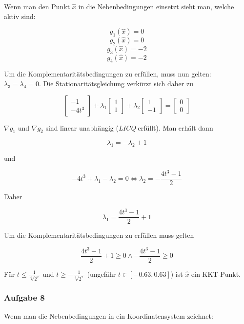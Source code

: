 \documentclass[a4paper, 12pt]{report}
\begin{document}
Wenn man den Punkt $\hat{x}$ in die Nebenbedingungen einsetzt sieht man, welche aktiv sind:

$$g_1(\hat{x}) = 0$$
$$g_2(\hat{x}) = 0$$
$$g_3(\hat{x}) = -2$$
$$g_4(\hat{x}) = -2$$

Um die Komplementaritätsbedingungen zu erfüllen, muss nun gelten:\\
$\lambda_3 = \lambda_4 = 0$. Die Stationaritätsgleichung verkürzt sich daher zu

$$\begin{bmatrix}-1\\-4t^3\end{bmatrix} + \lambda_1 \begin{bmatrix}1\\1\end{bmatrix} + \lambda_2\begin{bmatrix}1\\-1\end{bmatrix} = \begin{bmatrix}0\\0\end{bmatrix}$$

$\nabla g_1$ und $\nabla g_2$ sind linear unabhängig (\textit{LICQ} erfüllt). Man erhält dann

$$\lambda_1 = -\lambda_2 + 1$$

und

$$-4t^3 + \lambda_1 - \lambda_2 = 0 \Leftrightarrow \lambda_2 = - \frac{4t^3 - 1}{2}$$

Daher

$$\lambda_1 = \frac{4t^3 - 1}{2} + 1$$

Um die Komplementaritätsbedingungen zu erfüllen muss gelten

$$\frac{4t^3 - 1}{2} + 1 \geq 0 \land - \frac{4t^3 - 1}{2} \geq 0$$

Für $t \leq \frac{1}{\sqrt[3]{2^2}}$ und $t \geq -\frac{1}{\sqrt[3]{2^2}}$ (ungefähr $t \in [-0.63, 0.63]$) ist $\hat{x}$ ein KKT-Punkt.

\subsubsection{Aufgabe 8}

Wenn man die Nebenbedingungen in ein Koordinatensystem zeichnet:
\end{document}
